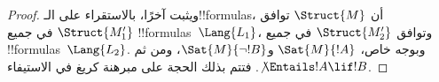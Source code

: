 \documentclass[../../../include/open-logic-section]{subfiles}
\begin{document}
\begin{proof}
ويثبت آخرًا، بالاستقراء على الـ!!{formula}s، أن $\Struct{M}$ توافق
$\Struct{M'_1}$ في جميع !!{formula}s~$\Lang{L_1}$، وتوافق
$\Struct{M'_2}$ في جميع !!{formula}s~$\Lang{L_2}$. وبوجه خاص،
$\Sat{M}{!A}$ و$\Sat{M}{\lnot!B}$، ومن ثم
$\not\Entails !A \lif !B$. فتتم بذلك الحجة على مبرهنة كريغ في الاستيفاء.
\end{proof}
\end{document}
